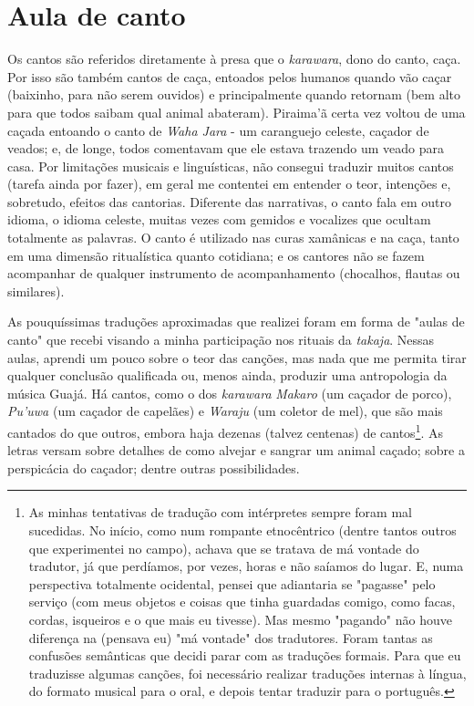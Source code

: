 \section{Aula de canto}

Os cantos são referidos diretamente à presa que o \emph{karawara}, dono
do canto, caça. Por isso são também cantos de caça, entoados pelos
humanos quando vão caçar (baixinho, para não serem ouvidos) e
principalmente quando retornam (bem alto para que todos saibam qual
animal abateram). Piraima'ã certa vez voltou de uma caçada entoando o
canto de \emph{Waha Jara} - um caranguejo celeste, caçador de veados; e,
de longe, todos comentavam que ele estava trazendo um veado para casa.
Por limitações musicais e linguísticas, não consegui traduzir muitos
cantos (tarefa ainda por fazer), em geral me contentei em entender o
teor, intenções e, sobretudo, efeitos das cantorias. Diferente das
narrativas, o canto fala em outro idioma, o idioma celeste, muitas vezes
com gemidos e vocalizes que ocultam totalmente as palavras. O canto é
utilizado nas curas xamânicas e na caça, tanto em uma dimensão
ritualística quanto cotidiana; e os cantores não se fazem acompanhar de
qualquer instrumento de acompanhamento (chocalhos, flautas ou
similares).

As pouquíssimas traduções aproximadas que realizei foram em forma de
"aulas de canto" que recebi visando a minha participação nos rituais da
\emph{takaja}. Nessas aulas, aprendi um pouco sobre o teor das canções,
mas nada que me permita tirar qualquer conclusão qualificada ou, menos
ainda, produzir uma antropologia da música Guajá. Há cantos, como o dos
\emph{karawara} \emph{Makaro} (um caçador de porco), \emph{Pu'uwa} (um
caçador de capelães) e \emph{Waraju} (um coletor de mel), que são mais
cantados do que outros, embora haja dezenas (talvez centenas) de
cantos\footnote{As minhas tentativas de tradução com intérpretes sempre
  foram mal sucedidas. No início, como num rompante etnocêntrico (dentre
  tantos outros que experimentei no campo), achava que se tratava de má
  vontade do tradutor, já que perdíamos, por vezes, horas e não saíamos
  do lugar. E, numa perspectiva totalmente ocidental, pensei que
  adiantaria se "pagasse" pelo serviço (com meus objetos e coisas que
  tinha guardadas comigo, como facas, cordas, isqueiros e o que mais eu
  tivesse). Mas mesmo "pagando" não houve diferença na (pensava eu) "má
  vontade" dos tradutores. Foram tantas as confusões semânticas que
  decidi parar com as traduções formais. Para que eu traduzisse algumas
  canções, foi necessário realizar traduções internas à língua, do
  formato musical para o oral, e depois tentar traduzir para o
  português.}. As letras versam sobre detalhes de como alvejar e sangrar
um animal caçado; sobre a perspicácia do caçador; dentre outras
possibilidades.

